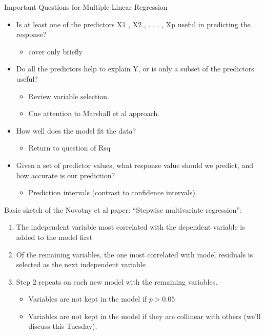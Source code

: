 \documentclass[aspectratio=169]{beamer}
\begin{document}
\begin{frame}{Important Questions for Multiple Linear Regression}
  \begin{itemize}
    \item Is at least one of the predictors X1 , X2 , . . . , Xp useful in predicting the response?
    \begin{itemize}
      \item cover only briefly
    \end{itemize}
    \item Do all the predictors help to explain Y, or is only a subset of the predictors useful?
    \begin{itemize}
      \item Review variable selection.  
      \item Cue attention to Marshall et al approach.
    \end{itemize}
    \item How well does the model fit the data?
    \begin{itemize}
      \item Return to question of Rsq
    \end{itemize}
    \item Given a set of predictor values, what response value should we predict, and how accurate is our prediction?  
    \begin{itemize}
      \item Prediction intervals (contrast to confidence intervals)
    \end{itemize}
  \end{itemize}
\end{frame}



\begin{frame}{Basic sketch of the Novotny et al paper:}
``Stepwise multivariate regression'':
\begin{enumerate}
\item The independent variable most correlated with the dependent variable is added to the model first
\item Of the remaining variables, the one most correlated with model residuals is selected as the next independent variable
\item Step 2 repeats on each new model with the remaining variables.  
\begin{itemize}
\item Variables are not kept in the model if $p>0.05$
\item Variables are not kept in the model if they are collinear with others (we'll discuss this Tuesday).
\end{itemize}
\end{enumerate}
\end{frame}
\end{document}
